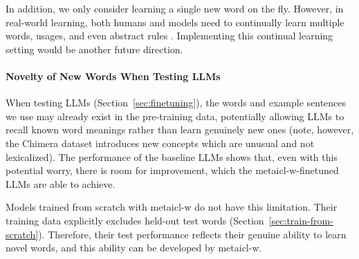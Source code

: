 \documentclass{article}
\begin{document}
In addition, we only consider learning a single new word on the fly.
However, in real-world learning, both humans and models need to continually learn multiple words, usages, and even abstract rules \citep{mueller-etal-2024-context}. Implementing this continual learning setting would be another future direction.

\paragraph{Novelty of New Words When Testing LLMs}
When testing LLMs (Section~\ref{sec:finetuning}), the words and example sentences we use may already exist in the pre-training data, potentially allowing LLMs to recall known word meanings rather than learn genuinely new ones (note, however, the Chimera dataset introduces new concepts which are unusual and not lexicalized).
The performance of the baseline LLMs shows that, even with this potential worry, there is room for improvement, which the \ac{metaicl-w}-finetuned LLMs are able to achieve.

Models trained from scratch with \ac{metaicl-w} do not have this limitation. Their training data explicitly excludes held-out test words (Section~\ref{sec:train-from-scratch}). Therefore, their test performance reflects their genuine ability to learn novel words, and this ability can be developed by \ac{metaicl-w}.

\end{document}
